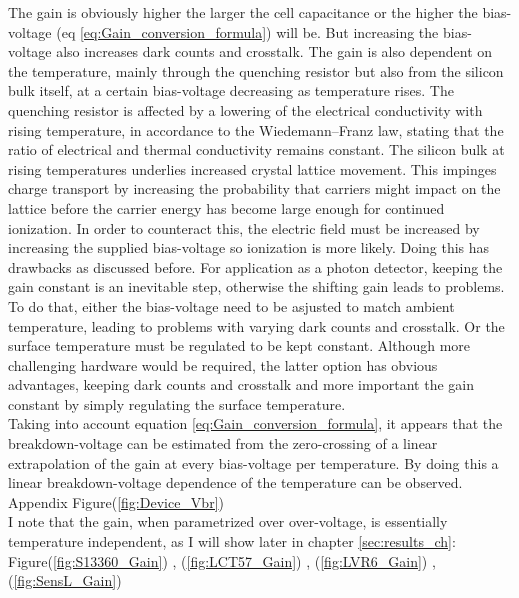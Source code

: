 \documentclass[12pt,article,type=msc,colorback,accentcolor=tud9c]{tudthesis}
\begin{document}
The gain is obviously higher the larger the cell capacitance or the higher the bias-voltage (eq \ref{eq:Gain_conversion_formula}) will be. But increasing the bias-voltage also increases dark counts and crosstalk. 
The gain is also dependent on the temperature, mainly through the quenching resistor but also from the silicon bulk itself, at a certain bias-voltage decreasing as temperature rises. The quenching resistor is affected by a lowering of the electrical conductivity with rising temperature, in accordance to the Wiedemann–Franz law, stating that the ratio of electrical and thermal conductivity remains constant. The silicon bulk at rising temperatures underlies increased crystal lattice movement. This impinges charge transport by increasing the probability that carriers might impact on the lattice before the carrier energy has become large enough for continued ionization. In order to counteract this, the electric field must be increased by increasing the supplied bias-voltage so ionization is more likely. Doing this has drawbacks as discussed before. For application as a photon detector, keeping the gain constant is an inevitable step, otherwise the shifting gain leads to problems. To do that, either the bias-voltage need to be asjusted to match ambient temperature, leading to problems with varying dark counts and crosstalk. Or the surface temperature must be regulated to be kept constant. Although more challenging hardware would be required, the latter option has obvious advantages, keeping dark counts and crosstalk and more important the gain constant by simply regulating the surface temperature.\\
Taking into account equation \ref{eq:Gain_conversion_formula}, it appears that the breakdown-voltage can be estimated from the zero-crossing of a linear extrapolation of the gain at every bias-voltage per temperature. By doing this a linear breakdown-voltage dependence of the temperature can be observed. Appendix Figure(\ref{fig:Device_Vbr})\\
I note that the gain, when parametrized over over-voltage, is essentially temperature independent, as I will show later in chapter \ref{sec:results_ch}: Figure(\ref{fig:S13360_Gain}) , (\ref{fig:LCT57_Gain}) , (\ref{fig:LVR6_Gain}) , (\ref{fig:SensL_Gain})\\
\end{document}
